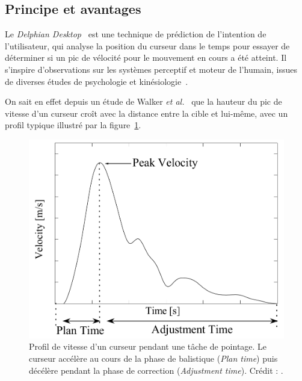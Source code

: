 	\subsection{Principe et avantages}
	Le \emph{Delphian Desktop}~\cite{asano2005predictive} est une technique de prédiction de l'intention de l'utilisateur, qui analyse la position du curseur dans le temps pour essayer de déterminer si un pic de vélocité pour le mouvement en cours a été atteint. Il s'inspire d'observations sur les systèmes perceptif et moteur de l'humain, issues de diverses études de psychologie et kinésiologie~\cite{accot2003refining, graham1995pointing, graham1996physical, mackenzie1992extending, mackenzie1994prediction, takagi2002fundamental, walker1993spatial}.
	
	On sait en effet depuis un étude de Walker \emph{et al.}~\cite{walker1993spatial} que la hauteur du pic de vitesse d'un curseur croît avec la distance entre la cible et lui-même, avec un profil typique illustré par la figure~\ref{fig:delphianPeak}.
	
	\begin{figure}[H]
		\centering
		\includegraphics[width=\textwidth]{figures/ch2/delphianPeak}
		\caption[Profil de vitesse d'un curseur pendant une tâche de pointage]{Profil de vitesse d'un curseur pendant une tâche de pointage. Le curseur accélère au cours de la phase de balistique (\emph{Plan time}) puis décélère pendant la phase de correction (\emph{Adjustment time}). Crédit : \cite{asano2005predictive}.}
		\label{fig:delphianPeak}
	\end{figure}
	
